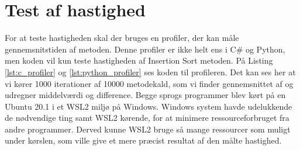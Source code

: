 \documentclass[class=report, crop=false]{standalone}
\begin{document}
    \section{Test af hastighed}
    For at teste hastigheden skal der bruges en profiler, der kan måle gennemsnitstiden af metoden. Denne profiler er ikke helt ens i C\# og Python, men koden vil kun teste hastigheden af Insertion Sort metoden. På Listing \ref{lst:c_profiler} og \ref{lst:python_profiler} ses koden til profileren. Det kan ses her at vi kører 1000 iterationer af 10000 metodekald, som vi finder gennemsnittet af og udregner middelværdi og difference.
    Begge sprogs programmer blev kørt på en Ubuntu 20.1 i et WSL2 miljø på Windows. Windows system havde udelukkende de nødvendige ting samt WSL2 kørende, for at minimere ressourceforbruget fra andre programmer. Derved kunne WSL2 bruge så mange ressourcer som muligt under kørslen, som ville give et mere præcist resultat af den målte hastighed.
    \begin{tcolorbox}
        \lstset{style=codestyle}
        C}, lastline=22, caption={C\# Profiler}, label={lst:c_profiler}]{Kode/Profiler.cs}
    \end{tcolorbox}
    \begin{tcolorbox}
        \lstset{style=codestyle}
        
    \end{tcolorbox}
\end{document}

